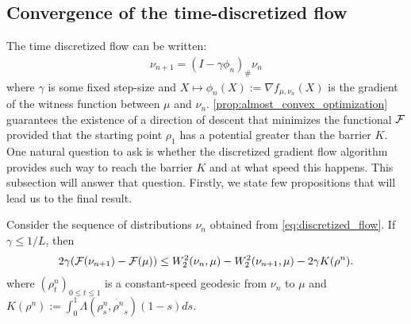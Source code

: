 

\subsection{Convergence of the time-discretized flow}

The time discretized flow can be written:
\begin{align}\label{eq:discretized_flow}
\nu_{n+1} = (I -\gamma \phi_n)_{\#}\nu_n
\end{align}
where $\gamma$ is some fixed step-size and $X \mapsto \phi_n(X):=\nabla f_{\mu, \nu_n}(X)$ is the gradient of the witness function between $\mu$ and $\nu_n$.%
\cref{prop:almost_convex_optimization} guarantees the existence of a direction of descent that minimizes the functional ${{\mathcal F}}$ provided that the starting point $\rho_1$ has a potential greater than the barrier $K$.%
One natural question to ask is whether the  discretized gradient flow algorithm provides such way to reach the barrier $K$ and at what speed this happens. This subsection will answer that question. Firstly, we state few propositions that will lead us to the final result.



\begin{proposition}\label{prop:evi}
	Consider the sequence of distributions $\nu_n$ obtained from \cref{eq:discretized_flow}. If $\gamma \leq 1/L$, then
	\begin{align}
2\gamma({{\mathcal F}}(\nu_{n+1})-{{\mathcal F}}(\mu))
\leq 
W_2^2(\nu_n,\mu)-W_2^2(\nu_{n+1},\mu)-2\gamma K(\rho^n).
\label{eq:evi}
\end{align}
where $(\rho^n_t)_{0\leq t \leq 1}$ is a constant-speed geodesic from $\nu_n$ to $\mu$ and $K(\rho^n):=\int_0^1 \Lambda(\rho^n_s,\dot{\rho^n}_s)(1-s)ds$.
\end{proposition}

